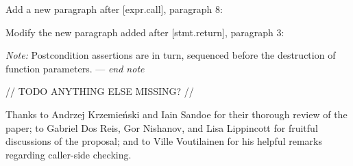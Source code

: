 Add a new paragraph after [expr.call], paragraph 8:


Modify the new paragraph added after [stmt.return], paragraph 3:

\begin{adjustwidth}{0.5cm}{0.5cm}

\emph{Note:} Postcondition assertions  are  in turn, sequenced before the destruction of function parameters. --- \emph{end note}

\end{adjustwidth}

// TODO ANYTHING ELSE MISSING? //


Thanks to Andrzej Krzemie\' nski and Iain Sandoe for their thorough review of the paper; to Gabriel Dos Reis, Gor Nishanov, and Lisa Lippincott for fruitful discussions of the proposal; and to Ville Voutilainen for his helpful remarks regarding caller-side checking.


\renewcommand{\addcontentsline}[3]{}%







